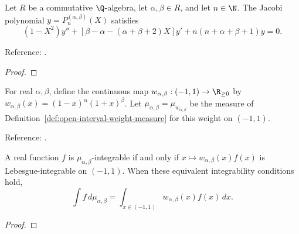 \begin{theorem}
\label{thm:jacobi-ode}
\leanok
Let $R$ be a commutative $\Q$-algebra, let $\alpha,\beta\in R$, and let $n\in\N$.
The Jacobi polynomial $y=P_n^{(\alpha,\beta)}(X)$ satisfies
\[(1-X^2)y''+[\beta-\alpha-(\alpha+\beta+2)X]y'
+n(n+\alpha+\beta+1)y=0.\]

Reference: \cite[Table 18.8.1]{dlmf}.
\end{theorem}
\begin{proof}
\leanok
\end{proof}

\begin{definition}
\label{def:jacobi-measure}
\leanok
For real $\alpha,\beta$, define the continuous map
$w_{\alpha,\beta}:(-1,1)\to\R_{\ge0}$ by $w_{\alpha,\beta}(x)=(1-x)^\alpha(1+x)^\beta$.
Let $\mu_{\alpha,\beta}=\mu_{w_{\alpha,\beta}}$ be the measure of
Definition~\ref{def:open-interval-weight-measure} for this weight on $(-1,1)$.

Reference: \cite[Table 18.3.1]{dlmf}.
\end{definition}

\begin{theorem}
\label{thm:jacobi-measure-characterisation}
\leanok
A real function $f$ is $\mu_{\alpha,\beta}$-integrable if and only if $x\mapsto w_{\alpha,\beta}(x)f(x)$ is Lebesgue-integrable on $(-1,1)$. When these equivalent integrability conditions hold,
\[\int f\,d\mu_{\alpha,\beta}=\int_{x\in(-1,1)}w_{\alpha,\beta}(x)f(x)\,dx.\]
\end{theorem}
\begin{proof}
\leanok
\end{proof}

